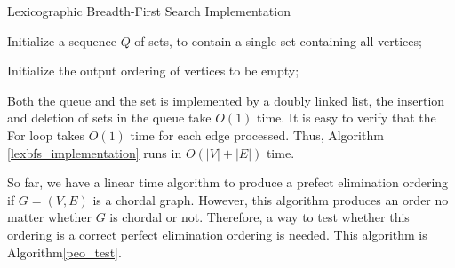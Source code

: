 \begin{algorithm}[H]

\SetAlgoLined
\caption{Lexicographic Breadth-First Search Implementation}
\label{lexbfs_implementation}
\BlankLine
\Begin
{    
	Initialize a sequence $Q$ of sets, to contain a single set containing all vertices;
    
    Initialize the output ordering of vertices to be empty;
    
   
}       
\end{algorithm}

Both the queue and the set is implemented by a doubly linked list, the insertion and deletion of sets in the queue take $O(1)$ time. It is easy to verify that the For loop takes $O(1)$ time for each edge processed. Thus, Algorithm \ref{lexbfs_implementation} runs in $O(|V|+|E|)$ time.

So far, we have a linear time algorithm to produce a prefect elimination ordering if $G=(V,E)$ is a chordal graph. However, this algorithm produces an order no matter whether $G$ is chordal or not. Therefore, a way to test whether this ordering is a correct perfect elimination ordering is needed. This algorithm is Algorithm\ref{peo_test}.

